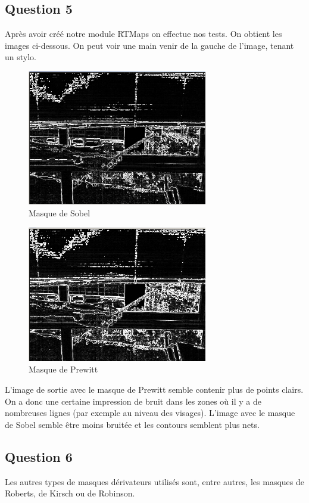 \subsection{Question 5}
Après avoir créé notre module RTMaps on effectue nos tests. On obtient les images ci-dessous. On peut voir une main venir de la gauche de l'image, tenant un stylo.
\begin{figure}[!h]
   \centering\includegraphics[width=0.7\textwidth]{pictures/sobel_comp.png}
   \caption{Masque de Sobel}
\end{figure}
\begin{figure}[!h]
   \centering\includegraphics[width=0.7\textwidth]{pictures/prewitt_comp.png}
   \caption{Masque de Prewitt}
\end{figure}

L'image de sortie avec le masque de Prewitt semble contenir plus de points clairs. On a donc une certaine impression de \og bruit\fg{} dans les zones où il y a de nombreuses lignes (par exemple au niveau des visages).
L'image avec le masque de Sobel semble être moins \og bruitée\fg{} et les contours semblent plus nets.

\subsection{Question 6}
Les autres types de masques dérivateurs utilisés sont, entre autres, les masques de Roberts, de Kirsch ou de Robinson.